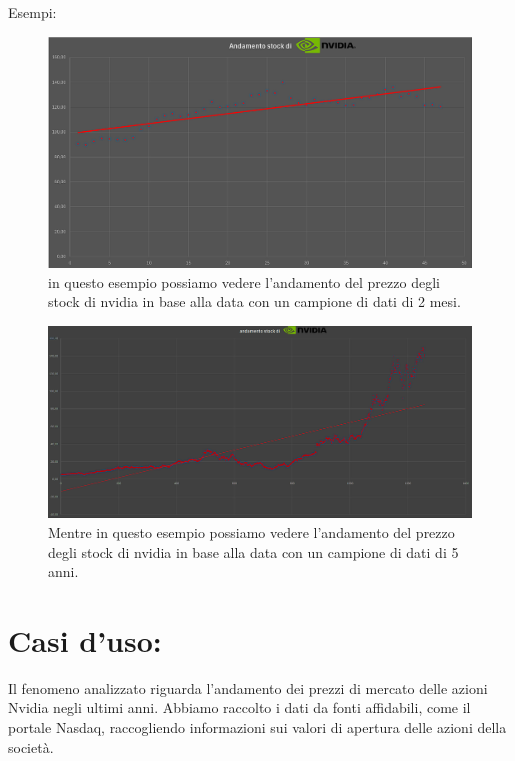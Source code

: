 \documentclass[11pt]{article}
\begin{document}
\begin{center}
    Esempi:\\

\begin{figure}[ht!]
    \centering
    \includegraphics[width=\textwidth]{immagini/Screenshot 2024-11-20 000800.png}
    \caption{in questo esempio possiamo vedere l'andamento del prezzo degli stock di nvidia in base alla data con un campione di dati di 2 mesi.}
\end{figure}
\begin{figure}[ht!]
    \centering
    \includegraphics[width=\textwidth]{immagini/Screenshot 2024-11-20 210756.png}
    \caption{Mentre in questo esempio possiamo vedere l'andamento del prezzo degli stock di nvidia in base alla data con un campione di dati di 5 anni.}
\end{figure}
\end{center}
\section*{Casi d'uso:}
Il fenomeno analizzato riguarda l'andamento dei prezzi di mercato delle azioni Nvidia negli ultimi anni. Abbiamo raccolto i dati da fonti affidabili, come il portale Nasdaq, 
raccogliendo informazioni sui valori di apertura delle azioni della società.
\end{document}
